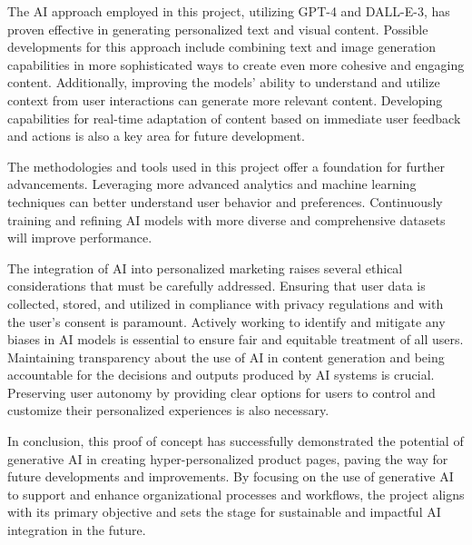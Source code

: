 \documentclass[%
pdftex,
oneside,			%
11pt,				%
parskip=half,		%
headheight = 12pt,	%
headsepline,		%
footsepline,		%
footheight = 16pt,	%
abstracton,		%
DIV=calc,		%
BCOR=8mm,		%
headinclude=false,	%
footinclude=false,	%
listof=totoc,		%
toc=bibliography,	%
]{scrreprt}	%
\begin{document}
    The AI approach employed in this project, utilizing GPT-4 and DALL-E-3, has proven effective in generating personalized text and visual content. 
    Possible developments for this approach include combining text and image generation capabilities in more sophisticated ways to create even more cohesive and engaging content. 
    Additionally, improving the models' ability to understand and utilize context from user interactions can generate more relevant content. 
    Developing capabilities for real-time adaptation of content based on immediate user feedback and actions is also a key area for future development.
    
    The methodologies and tools used in this project offer a foundation for further advancements. 
    Leveraging more advanced analytics and machine learning techniques can better understand user behavior and preferences. 
    Continuously training and refining AI models with more diverse and comprehensive datasets will improve performance. 

    The integration of AI into personalized marketing raises several ethical considerations that must be carefully addressed. 
    Ensuring that user data is collected, stored, and utilized in compliance with privacy regulations and with the user's consent is paramount. 
    Actively working to identify and mitigate any biases in AI models is essential to ensure fair and equitable treatment of all users. 
    Maintaining transparency about the use of AI in content generation and being accountable for the decisions and outputs produced by AI systems is crucial. 
    Preserving user autonomy by providing clear options for users to control and customize their personalized experiences is also necessary.
    
    In conclusion, this proof of concept has successfully demonstrated the potential of generative AI in creating hyper-personalized product pages, paving the way for future developments and improvements. 
    By focusing on the use of generative AI to support and enhance organizational processes and workflows, the project aligns with its primary objective and sets the stage for sustainable and impactful AI integration in the future.
    


\cleardoublepage

\ifx\VAlterZitierstil\VTrueValue
    \printbibliography
\else
    
\fi
\end{document}
